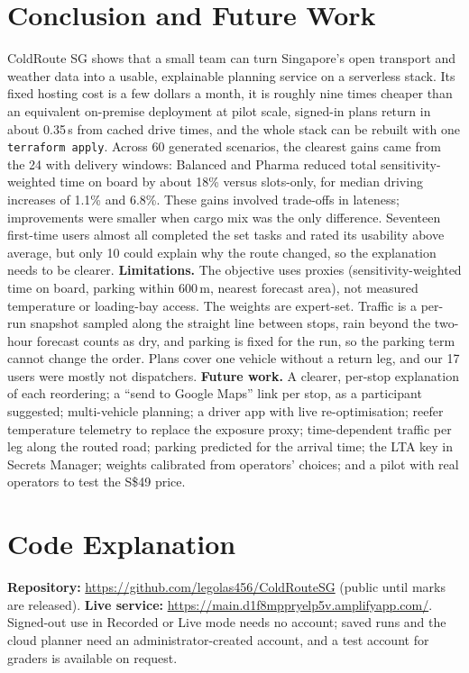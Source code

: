 \documentclass[10.5pt,a4paper]{article}
\newcommand{\Sd}{S\$}
\begin{document}
\section{Conclusion and Future Work}
ColdRoute SG shows that a small team can turn Singapore's open transport and weather data into a usable, explainable
planning service on a serverless stack. Its fixed hosting cost is a few dollars a month, it is roughly nine times cheaper than
an equivalent on-premise deployment at pilot scale, signed-in plans return in about 0.35\,s from cached drive times, and the whole
stack can be rebuilt with one \texttt{terraform apply}. Across 60 generated scenarios, the clearest gains came from the 24 with delivery windows: Balanced and Pharma reduced total sensitivity-weighted time on board by about 18\% versus slots-only, for median driving increases of 1.1\% and 6.8\%. These gains involved trade-offs in lateness; improvements were smaller when cargo mix was the only difference. Seventeen first-time users almost all completed the set tasks and rated
its usability above average, but only 10 could explain why the route changed, so the explanation needs to be clearer.
\textbf{Limitations.} The objective uses proxies (sensitivity-weighted time on board, parking within 600\,m, nearest
forecast area), not measured temperature or loading-bay access. The weights are expert-set. Traffic is a per-run snapshot
sampled along the straight line between stops, rain beyond the two-hour forecast counts as dry, and parking is fixed for
the run, so the parking term cannot change the order. Plans cover one vehicle
without a return leg, and our 17 users were mostly not dispatchers.
\textbf{Future work.} A clearer, per-stop explanation of each reordering; a ``send to Google Maps'' link per stop, as a participant suggested; multi-vehicle planning; a driver app with live re-optimisation; reefer temperature telemetry to replace
the exposure proxy; time-dependent traffic per leg along the routed road; parking predicted for the arrival time; the LTA key in Secrets Manager; weights calibrated from operators' choices; and a pilot with real operators
to test the \Sd49 price.

\section{Code Explanation}
\textbf{Repository:} \url{https://github.com/legolas456/ColdRouteSG} (public until marks are released).
\textbf{Live service:} \url{https://main.d1f8mppryelp5v.amplifyapp.com/}. Signed-out use in Recorded or Live mode needs no account; saved runs and the cloud planner need an
administrator-created account, and a test account for graders is available on request.
\end{document}
